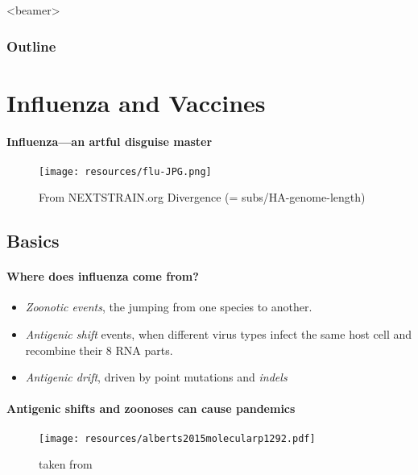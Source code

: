 \documentclass{beamer}
\begin{document}
\begin{darkframes}
  \begin{frame}<beamer>
           \frametitle{Outline}
           \footnotesize
           \tableofcontents
  \end{frame}







  \section{Influenza and Vaccines}

    \begin{frame}{\secname}
      \framesubtitle{Influenza---an artful disguise master}
      \begin{figure}
        \texttt{[image: resources/flu-JPG.png]}
        \caption{\footnotesize From NEXTSTRAIN.org Divergence (= subs/HA-genome-length)}
      \end{figure}
    \end{frame}



    \subsection{Basics}

    \begin{frame}{\subsecname}
      \framesubtitle{Where does influenza come from?}
      \begin{itemize}
      \item \textit{Zoonotic events}, the jumping from one species to another.
      \item \textit{Antigenic shift} events, when different virus types infect the same host cell and recombine their 8 RNA parts.
      \item \textit{Antigenic drift}, driven by point mutations and \textit{indels}
      \end{itemize}
    \end{frame}

    \begin{frame}{\subsecname}
      \framesubtitle{Antigenic shifts and zoonoses can cause pandemics}
      \begin{figure}
        \texttt{[image: resources/alberts2015molecularp1292.pdf]}
        \caption{taken from \cite{alberts15}}
      \end{figure}{}
    \end{frame}{}


\end{darkframes}
\end{document}
